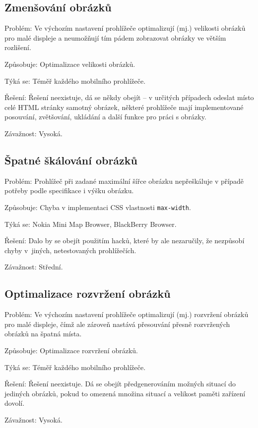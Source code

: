 \subsection{Zmenšování obrázků}
\begin{description*}
\item[Problém:] Ve výchozím nastavení prohlížeče optimalizují (mj.) velikosti obrázků pro malé displeje a neumožňují tím pádem zobrazovat obrázky ve větším rozlišení.
\item[Způsobuje:] Optimalizace velikosti obrázků.
\item[Týká se:] Téměř každého mobilního prohlížeče.
\item[Řešení:] Řešení neexistuje, dá se někdy obejít -- v určitých případech odeslat místo celé HTML stránky samotný obrázek, některé prohlížeče mají implementované posouvání, zvětšování, ukládání a další funkce pro práci s obrázky.
\item[Závažnost:] Vysoká.
\end{description*}

\subsection{Špatné škálování obrázků}
\begin{description*}
\item[Problém:] Prohlížeč při zadané maximální šířce obrázku nepřeškáluje v případě potřeby podle specifikace \cite{CssDoc} i výšku obrázku.
\item[Způsobuje:] Chyba v implementaci CSS vlastnosti \texttt{max-width}.
\item[Týká se:] Nokia Mini Map Browser, BlackBerry Browser.
\item[Řešení:] Dalo by se obejít použitím hacků, které by ale nezaručily, že nezpůsobí chyby v~jiných, netestovaných prohlížečích.
\item[Závažnost:] Střední.
\end{description*}

\subsection{Optimalizace rozvržení obrázků}
\label{subs:rozvrzeniObrazku}
\begin{description*}
\item[Problém:] Ve výchozím nastavení prohlížeče optimalizují (mj.) rozvržení obrázků pro malé displeje, čímž ale zároveň nastává přesouvání přesně rozvržených obrázků na špatná místa.
\item[Způsobuje:] Optimalizace rozvržení obrázků.
\item[Týká se:] Téměř každého mobilního prohlížeče.
\item[Řešení:] Řešení neexistuje. Dá se obejít předgenerováním možných situací do jediných obrázků, pokud to omezená množina situací a velikost paměti zařízení dovolí.
\item[Závažnost:] Vysoká.
\end{description*}

